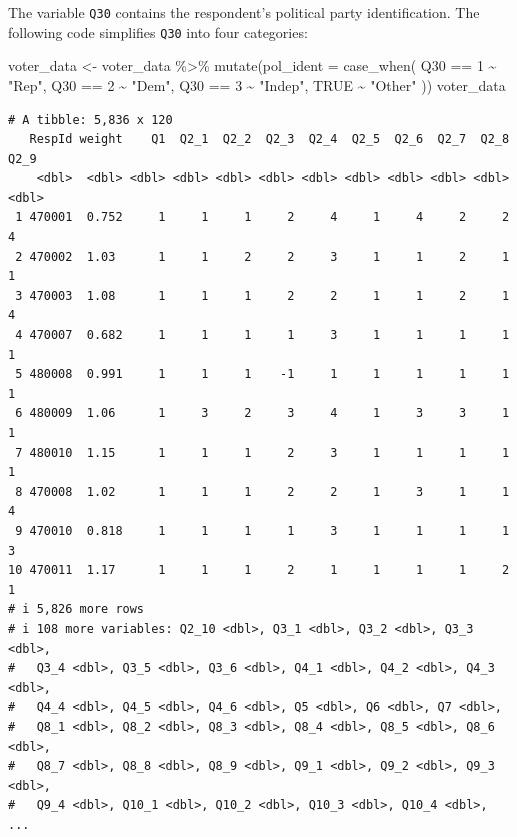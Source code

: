 \documentclass[
  letterpaper,
  DIV=11,
  numbers=noendperiod]{scrartcl}
\newenvironment{Shaded}{\begin{snugshade}}{\end{snugshade}}
\newcommand{\AttributeTok}[1]{\textcolor[rgb]{0.40,0.45,0.13}{#1}}
\newcommand{\ConstantTok}[1]{\textcolor[rgb]{0.56,0.35,0.01}{#1}}
\newcommand{\DecValTok}[1]{\textcolor[rgb]{0.68,0.00,0.00}{#1}}
\newcommand{\FunctionTok}[1]{\textcolor[rgb]{0.28,0.35,0.67}{#1}}
\newcommand{\NormalTok}[1]{\textcolor[rgb]{0.00,0.23,0.31}{#1}}
\newcommand{\OtherTok}[1]{\textcolor[rgb]{0.00,0.23,0.31}{#1}}
\newcommand{\SpecialCharTok}[1]{\textcolor[rgb]{0.37,0.37,0.37}{#1}}
\newcommand{\StringTok}[1]{\textcolor[rgb]{0.13,0.47,0.30}{#1}}
\begin{document}
The variable \texttt{Q30} contains the respondent's political party
identification. The following code simplifies \texttt{Q30} into four
categories:

\begin{Shaded}
\begin{Highlighting}[]
\NormalTok{voter\_data }\OtherTok{\textless{}{-}}\NormalTok{ voter\_data }\SpecialCharTok{\%\textgreater{}\%}
  \FunctionTok{mutate}\NormalTok{(}\AttributeTok{pol\_ident =} \FunctionTok{case\_when}\NormalTok{(}
\NormalTok{    Q30 }\SpecialCharTok{==} \DecValTok{1} \SpecialCharTok{\textasciitilde{}} \StringTok{"Rep"}\NormalTok{,}
\NormalTok{    Q30 }\SpecialCharTok{==} \DecValTok{2} \SpecialCharTok{\textasciitilde{}} \StringTok{"Dem"}\NormalTok{,}
\NormalTok{    Q30 }\SpecialCharTok{==} \DecValTok{3} \SpecialCharTok{\textasciitilde{}} \StringTok{"Indep"}\NormalTok{,}
    \ConstantTok{TRUE} \SpecialCharTok{\textasciitilde{}} \StringTok{"Other"}
\NormalTok{  ))}
\NormalTok{voter\_data}
\end{Highlighting}
\end{Shaded}

\begin{verbatim}
# A tibble: 5,836 x 120
   RespId weight    Q1  Q2_1  Q2_2  Q2_3  Q2_4  Q2_5  Q2_6  Q2_7  Q2_8  Q2_9
    <dbl>  <dbl> <dbl> <dbl> <dbl> <dbl> <dbl> <dbl> <dbl> <dbl> <dbl> <dbl>
 1 470001  0.752     1     1     1     2     4     1     4     2     2     4
 2 470002  1.03      1     1     2     2     3     1     1     2     1     1
 3 470003  1.08      1     1     1     2     2     1     1     2     1     4
 4 470007  0.682     1     1     1     1     3     1     1     1     1     1
 5 480008  0.991     1     1     1    -1     1     1     1     1     1     1
 6 480009  1.06      1     3     2     3     4     1     3     3     1     1
 7 480010  1.15      1     1     1     2     3     1     1     1     1     1
 8 470008  1.02      1     1     1     2     2     1     3     1     1     4
 9 470010  0.818     1     1     1     1     3     1     1     1     1     3
10 470011  1.17      1     1     1     2     1     1     1     1     2     1
# i 5,826 more rows
# i 108 more variables: Q2_10 <dbl>, Q3_1 <dbl>, Q3_2 <dbl>, Q3_3 <dbl>,
#   Q3_4 <dbl>, Q3_5 <dbl>, Q3_6 <dbl>, Q4_1 <dbl>, Q4_2 <dbl>, Q4_3 <dbl>,
#   Q4_4 <dbl>, Q4_5 <dbl>, Q4_6 <dbl>, Q5 <dbl>, Q6 <dbl>, Q7 <dbl>,
#   Q8_1 <dbl>, Q8_2 <dbl>, Q8_3 <dbl>, Q8_4 <dbl>, Q8_5 <dbl>, Q8_6 <dbl>,
#   Q8_7 <dbl>, Q8_8 <dbl>, Q8_9 <dbl>, Q9_1 <dbl>, Q9_2 <dbl>, Q9_3 <dbl>,
#   Q9_4 <dbl>, Q10_1 <dbl>, Q10_2 <dbl>, Q10_3 <dbl>, Q10_4 <dbl>, ...
\end{verbatim}
\end{document}
